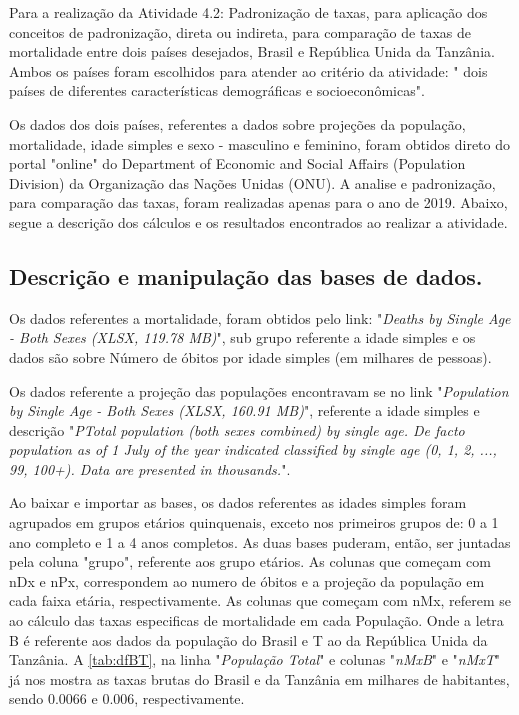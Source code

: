 
Para a realização da Atividade 4.2: Padronização de taxas, para aplicação dos conceitos de padronização, direta ou indireta, para comparação de taxas de mortalidade entre dois países desejados, Brasil e República Unida da Tanzânia. Ambos os países foram escolhidos para atender ao critério da atividade: " dois países de diferentes características demográficas e socioeconômicas".

Os dados dos dois países, referentes a dados sobre projeções da população, mortalidade, idade simples e sexo - masculino e feminino, foram obtidos direto do portal "online" do Department of Economic and Social Affairs (Population Division) da Organização das Nações Unidas (ONU). A analise e padronização, para comparação das taxas, foram realizadas apenas para o ano de 2019. Abaixo, segue a descrição dos cálculos e os resultados encontrados ao realizar a atividade.


\subsection{Descrição  e manipulação das bases de dados.}

Os dados referentes a mortalidade, foram obtidos pelo link: "\emph{Deaths by Single Age - Both Sexes (XLSX, 119.78 MB)}", sub grupo referente a idade simples e os dados são sobre Número de óbitos por idade simples (em milhares de pessoas).

Os dados referente a projeção das populações encontravam se no link "\emph{Population by Single Age - Both Sexes (XLSX, 160.91 MB)}", referente a idade simples e descrição "\emph{PTotal population (both sexes combined) by single age. De facto population as of 1 July of the year indicated classified by single age (0, 1, 2, ..., 99, 100+). Data are presented in thousands.}".

Ao baixar e importar as bases, os dados referentes as idades simples foram agrupados em grupos etários quinquenais, exceto nos primeiros grupos de: 0 a 1 ano completo e 1 a 4 anos completos. As duas bases puderam, então, ser juntadas pela coluna "grupo", referente aos grupo etários. As colunas que começam com nDx e nPx, correspondem ao numero de óbitos e a projeção da população em cada faixa etária, respectivamente. As colunas que começam com nMx, referem se ao cálculo das taxas especificas de mortalidade em cada População. Onde a letra B é referente aos dados da população do Brasil e T ao da República Unida da Tanzânia. A \ref{tab:dfBT}, na linha "\emph{População Total}" e colunas "\emph{nMxB}" e "\emph{nMxT}" já nos mostra as taxas brutas do Brasil e da Tanzânia em milhares de habitantes, sendo 0.0066 e 0.006, respectivamente.


